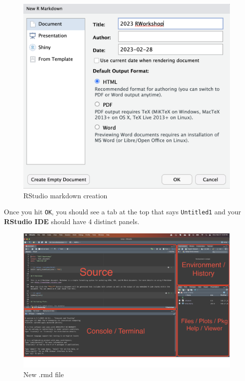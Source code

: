 \documentclass[
]{book}
\begin{document}
\begin{figure}
\includegraphics[width=16.14in]{images/2.4rmarkdown} \caption{RStudio markdown creation}\label{fig:unnamed-chunk-4}
\end{figure}

Once you hit \texttt{OK}, you should see a tab at the top that says \texttt{Untitled1} and your \textbf{RStudio IDE} should have 4 distinct panels.

\begin{figure}
\includegraphics[width=50in]{images/2.5newrmdfile} \caption{New .rmd file}\label{fig:unnamed-chunk-5}
\end{figure}
\end{document}
